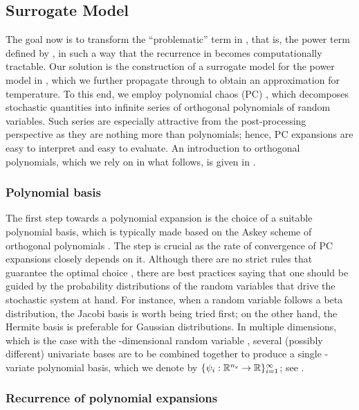 \subsection{Surrogate Model}

The goal now is to transform the ``problematic'' term in , that
is, the power term defined by , in such a way that the
recurrence in  becomes computationally tractable. Our solution
is the construction of a surrogate model for the power model in
, which we further propagate through  to
obtain an approximation for temperature. To this end, we employ polynomial chaos
(PC) \cite{xiu2010}, which decomposes stochastic quantities into infinite series
of orthogonal polynomials of random variables. Such series are especially
attractive from the post-processing perspective as they are nothing more than
polynomials; hence, PC expansions are easy to interpret and easy to evaluate. An
introduction to orthogonal polynomials, which we rely on in what follows, is
given in .

\subsubsection{Polynomial basis}

The first step towards a polynomial expansion is the choice of a suitable
polynomial basis, which is typically made based on the Askey scheme of
orthogonal polynomials \cite{xiu2010}. The step is crucial as the rate of
convergence of PC expansions closely depends on it. Although there are no strict
rules that guarantee the optimal choice \cite{knio2006}, there are best
practices saying that one should be guided by the probability distributions of
the random variables that drive the stochastic system at hand. For instance,
when a random variable follows a beta distribution, the Jacobi basis is worth
being tried first; on the other hand, the Hermite basis is preferable for
Gaussian distributions. In multiple dimensions, which is the case with the
\nz-dimensional random variable \vz, several (possibly different)
univariate bases are to be combined together to produce a single
\nz-variate polynomial basis, which we denote by $\{ \psi_i: \mathbb{R}^{n_\mathrm{z}}
\to \mathbb{R} \}_{i = 1}^\infty$; see \cite{xiu2010}.

\subsubsection{Recurrence of polynomial expansions}

